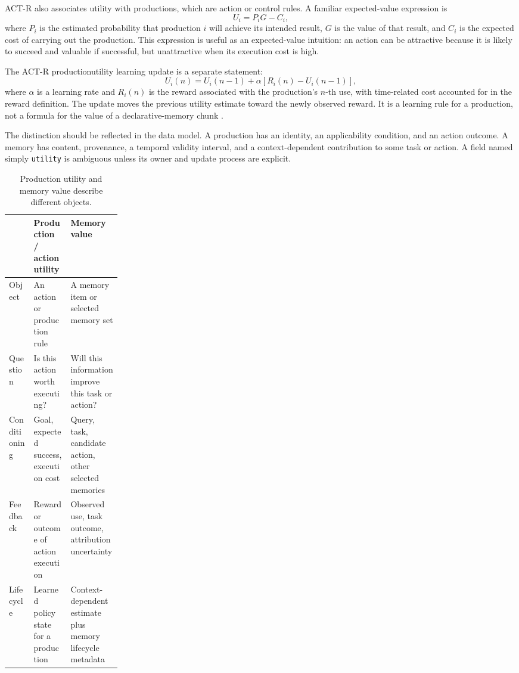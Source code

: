 ACT-R also associates utility with productions, which are action or control rules. A familiar expected-value expression is
\begin{equation}
  U_i = P_iG-C_i,
  \label{eq:ch12-production-expected-utility}
\end{equation}
where \(P_i\) is the estimated probability that production \(i\) will achieve its intended result, \(G\) is the value of that result, and \(C_i\) is the expected cost of carrying out the production. This expression is useful as an expected-value intuition: an action can be attractive because it is likely to succeed and valuable if successful, but unattractive when its execution cost is high.

The ACT-R \gls{productionutility} learning update is a separate statement:
\begin{equation}
  U_i(n)=U_i(n-1)+\alpha\left[R_i(n)-U_i(n-1)\right],
  \label{eq:ch12-production-learning}
\end{equation}
where \(\alpha\) is a learning rate and \(R_i(n)\) is the reward associated with the production's \(n\)-th use, with time-related cost accounted for in the reward definition. The update moves the previous utility estimate toward the newly observed reward. It is a learning rule for a production, not a formula for the value of a declarative-memory chunk \autocite{anderson2007actr}\autocite[pp. 235--237]{actr7manual}.

The distinction should be reflected in the data model. A production has an identity, an applicability condition, and an action outcome. A memory has content, provenance, a temporal validity interval, and a context-dependent contribution to some task or action. A field named simply \texttt{utility} is ambiguous unless its owner and update process are explicit.

\begin{table}[tbp]
\centering
\small
\caption{Production utility and memory value describe different objects.}
\label{tab:ch12-production-vs-memory}
\begin{tabularx}{\linewidth}{@{}p{0.22\linewidth}XX@{}}
\toprule
 & \textbf{Production / action utility} & \textbf{Memory value} \\
\midrule
Object & An action or production rule & A memory item or selected memory set \\
Question & Is this action worth executing? & Will this information improve this task or action? \\
Conditioning & Goal, expected success, execution cost & Query, task, candidate action, other selected memories \\
Feedback & Reward or outcome of action execution & Observed use, task outcome, attribution uncertainty \\
Lifecycle & Learned policy state for a production & Context-dependent estimate plus memory lifecycle metadata \\
\bottomrule
\end{tabularx}
\end{table}

